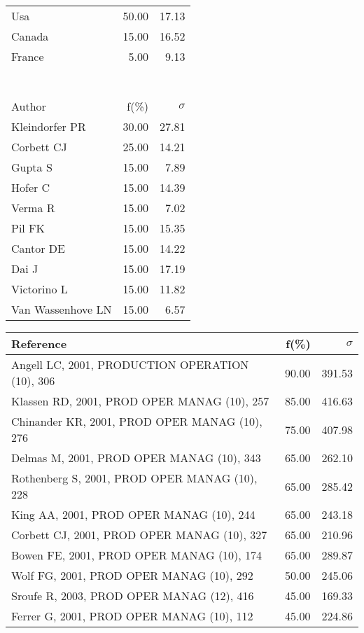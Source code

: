 \documentclass[a4paper,11pt]{report}
\begin{document}
\begin{landscape}
\begin{table}[!ht]
{\begin{tabular}{|l r r|}
\hline
Usa & 50.00 & 17.13\\
Canada & 15.00 & 16.52\\
France & 5.00 & 9.13\\
 &  & \\
 &  & \\
 &  & \\
 &  & \\
 &  & \\
 &  & \\
 &  & \\
\hline
\hline
Author & f(\%) & $\sigma$\\
\hline
Kleindorfer PR & 30.00 & 27.81\\
Corbett CJ & 25.00 & 14.21\\
Gupta S & 15.00 & 7.89\\
Hofer C & 15.00 & 14.39\\
Verma R & 15.00 & 7.02\\
Pil FK & 15.00 & 15.35\\
Cantor DE & 15.00 & 14.22\\
Dai J & 15.00 & 17.19\\
Victorino L & 15.00 & 11.82\\
Van Wassenhove LN & 15.00 & 6.57\\
\hline
\end{tabular}
}
{\scriptsize\begin{tabular}{|l r r|}
\hline
Reference & f(\%) & $\sigma$\\
\hline
Angell LC, 2001, PRODUCTION OPERATION (10), 306 & 90.00 & 391.53\\
Klassen RD, 2001, PROD OPER MANAG (10), 257 & 85.00 & 416.63\\
Chinander KR, 2001, PROD OPER MANAG (10), 276 & 75.00 & 407.98\\
Delmas M, 2001, PROD OPER MANAG (10), 343 & 65.00 & 262.10\\
Rothenberg S, 2001, PROD OPER MANAG (10), 228 & 65.00 & 285.42\\
King AA, 2001, PROD OPER MANAG (10), 244 & 65.00 & 243.18\\
Corbett CJ, 2001, PROD OPER MANAG (10), 327 & 65.00 & 210.96\\
Bowen FE, 2001, PROD OPER MANAG (10), 174 & 65.00 & 289.87\\
Wolf FG, 2001, PROD OPER MANAG (10), 292 & 50.00 & 245.06\\
Sroufe R, 2003, PROD OPER MANAG (12), 416 & 45.00 & 169.33\\
Ferrer G, 2001, PROD OPER MANAG (10), 112 & 45.00 & 224.86\\

\end{tabular}}
\end{table}
\end{landscape}
\end{document}
